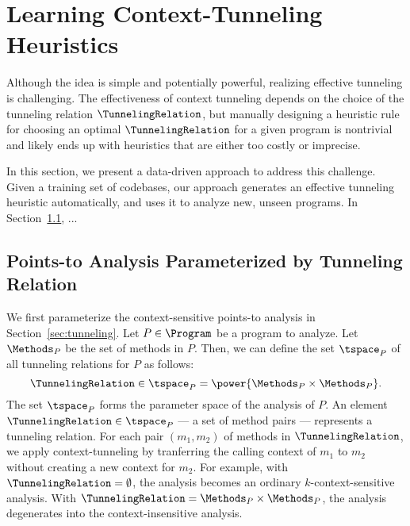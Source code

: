 \section{Learning Context-Tunneling Heuristics}\label{sec:learning}


Although the idea is simple and potentially powerful, realizing effective tunneling is
challenging. The effectiveness of context tunneling depends on the
choice of the tunneling relation $\TunnelingRelation$, but manually
designing a heuristic rule for choosing an optimal $\TunnelingRelation$ for a
given program is nontrivial and likely ends up with heuristics that
are either too costly or imprecise.

In this section, we present a data-driven approach to address this
challenge. Given a training set of codebases, our approach generates
an effective tunneling heuristic automatically, and uses it to analyze
new, unseen programs. In Section~\ref{sec:setting}, ...



\subsection{Points-to Analysis Parameterized by Tunneling Relation} \label{sec:setting}

We first parameterize the context-sensitive points-to analysis in
Section~\ref{sec:tunneling}.
Let $P \in \Program$ be a program to
analyze. Let $\Methods_P$ be the set of methods in $P$.  Then, we
can define the set $\tspace_P$ of all tunneling relations for $P$ as follows: %
\[
 \TunnelingRelation \in \tspace_P = \power{\Methods_P \times \Methods_P}.
\]
The set $\tspace_P$ forms the parameter space of the analysis of $P$.
An element $\TunnelingRelation \in \tspace_P$ --- a set of method pairs --- represents a tunneling
relation.
For each pair $(m_1,m_2)$ of methods in $\TunnelingRelation$, we apply
context-tunneling by tranferring
the calling context of $m_1$ to $m_2$ without creating a new context
for $m_2$.
For example, with $\TunnelingRelation = \emptyset$, the analysis
becomes an ordinary $k$-context-sensitive analysis. With
$\TunnelingRelation = \Methods_P \times \Methods_P$, the analysis degenerates into
the context-insensitive analysis.


